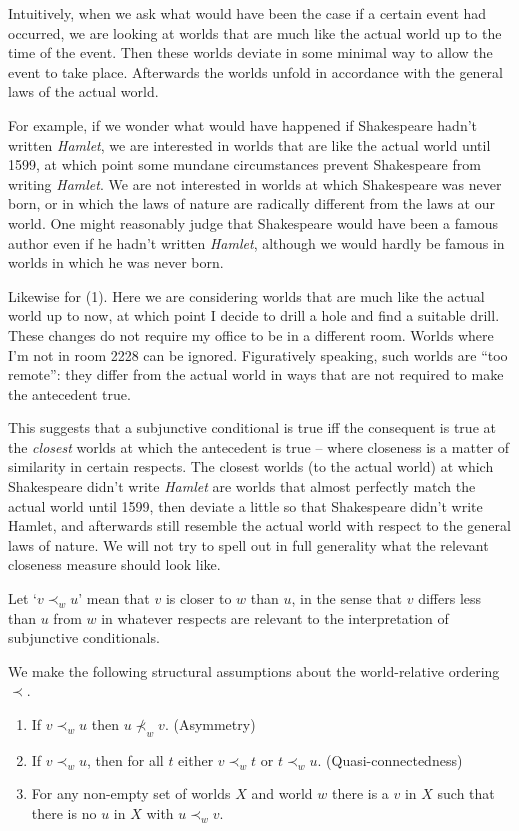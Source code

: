 Intuitively, when we ask what would have been the case if a certain event had
occurred, we are looking at worlds that are much like the actual world up to the
time of the event. Then these worlds deviate in some minimal way to allow the
event to take place. Afterwards the worlds unfold in accordance with the general
laws of the actual world.

For example, if we wonder what would have happened if Shakespeare hadn't written
\emph{Hamlet}, we are interested in worlds that are like the actual world until
1599, at which point some mundane circumstances prevent Shakespeare from writing
\emph{Hamlet}. We are not interested in worlds at which Shakespeare was never
born, or in which the laws of nature are radically different from the laws at
our world. One might reasonably judge that Shakespeare would have been a famous
author even if he hadn't written \emph{Hamlet}, although we would hardly be
famous in worlds in which he was never born.

Likewise for (1). Here we are considering worlds that are much like the actual
world up to now, at which point I decide to drill a hole and find a suitable
drill. These changes do not require my office to be in a different room. Worlds
where I'm not in room 2228 can be ignored. Figuratively speaking, such worlds
are ``too remote'': they differ from the actual world in ways that are not
required to make the antecedent true.

This suggests that a subjunctive conditional is true iff the consequent is true
at the \emph{closest} worlds at which the antecedent is true -- where closeness
is a matter of similarity in certain respects. The closest worlds (to the actual
world) at which Shakespeare didn't write \emph{Hamlet} are worlds that almost
perfectly match the actual world until 1599, then deviate a little so that
Shakespeare didn't write Hamlet, and afterwards still resemble the actual world
with respect to the general laws of nature. We will not try to spell out in full
generality what the relevant closeness measure should look like.

Let `$v \prec_w u$' mean that $v$ is closer to $w$ than $u$, in the sense that
$v$ differs less than $u$ from $w$ in whatever respects are relevant to the
interpretation of subjunctive conditionals.

We make the following structural assumptions about the world-relative ordering
$\prec$.

\begin{enumerate}[leftmargin=8mm]
  \itemsep-1mm
  \item If $v \prec_w u$ then $u \nprec_w v$. (Asymmetry)
  \item If $v \prec_w u$, then for all $t$ either $v \prec_w t$ or
        $t \prec_w u$. (Quasi-connectedness)
  \item For any non-empty set of worlds $X$ and world $w$ there is a $v$ in $X$
        such that there is no $u$ in $X$ with $u \prec_w v$.
\end{enumerate}

